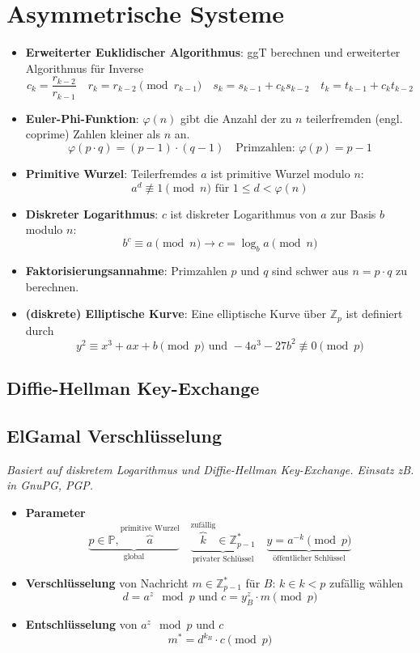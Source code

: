 \documentclass{article}
\begin{document}

\section{Asymmetrische Systeme}
\begin{itemize}
  \item \textbf{Erweiterter Euklidischer Algorithmus}: ggT berechnen und erweiterter Algorithmus für Inverse
    \[ c_k=\frac{r_{k-2}}{r_{k-1}} \quad r_k = r_{k-2} \pmod{r_{k-1}} \quad s_k=s_{k-1}+c_ks_{k-2} \quad t_k=t_{k-1}+c_kt_{k-2} \]
  \item \textbf{Euler-Phi-Funktion}: $\varphi(n)$ gibt die Anzahl der zu $n$ teilerfremden (engl. coprime) Zahlen kleiner als $n$ an.
    \[ \varphi(p \cdot q) = (p-1) \cdot (q-1) \quad \text{Primzahlen: }\varphi(p) = p-1 \]
  \item \textbf{Primitive Wurzel}: Teilerfremdes $a$ ist primitive Wurzel modulo $n$:
    \[ a^d \not\equiv 1 \pmod{n} \text{ für } 1 \leq d < \varphi(n) \]
  \item \textbf{Diskreter Logarithmus}: $c$ ist diskreter Logarithmus von $a$ zur Basis $b$ modulo $n$:
    \[ b^c \equiv a \pmod{n} \to c = \log_b a \pmod{n} \]
  \item \textbf{Faktorisierungsannahme}: Primzahlen $p$ und $q$ sind schwer aus $n=p \cdot q$ zu berechnen.
  \item \textbf{(diskrete) Elliptische Kurve}: Eine elliptische Kurve über $\mathbb{Z}_p$ ist definiert durch
    \[ y^2 \equiv x^3 + ax + b \pmod{p} \text{ und } -4a^3 - 27b^2 \not\equiv 0 \pmod{p} \]
\end{itemize}

\subsection{Diffie-Hellman Key-Exchange}


\subsection{ElGamal Verschlüsselung}
\textit{Basiert auf diskretem Logarithmus und Diffie-Hellman Key-Exchange. Einsatz zB. in GnuPG, PGP.}
\begin{itemize}
  \item \textbf{Parameter}
    \[
      \underbrace{p\in\mathbb{P}, \overbrace{a}^\text{primitive Wurzel}}_\text{global}\quad
      \underbrace{\overbrace{k}^\text{zufällig}\in\mathbb{Z}^*_{p-1}}_\text{privater Schlüssel}\quad
      \underbrace{y = a^{-k} \pmod{p}}_\text{öffentlicher Schlüssel} 
    \]
  \item \textbf{Verschlüsselung} von Nachricht $m\in\mathbb{Z}^*_{p-1}$ für $B$: $k \in k<p$ zufällig wählen
    \[ d = a^z \mod{p} \text{ und } c = y_B^z \cdot m \pmod{p} \]
  \item \textbf{Entschlüsselung} von $a^z \mod{p}$ und $c$
    \[ m^* = d^{k_B} \cdot c \pmod{p} \]
\end{itemize}
\end{document}
